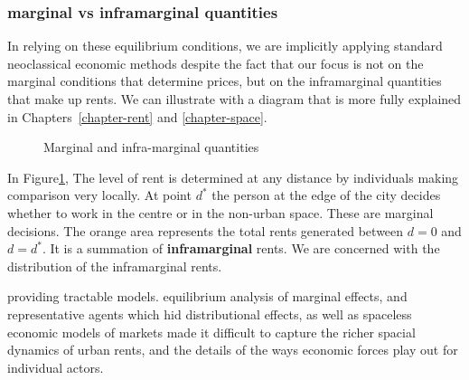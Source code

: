 {\subsubsection{\Gls{marginal} vs \gls{inframarginal} quantities}

In relying on these equilibrium conditions, we are implicitly applying standard neoclassical economic methods despite the fact that our focus is not on the \gls{marginal} conditions that determine prices, but on the \gls{inframarginal} quantities that make up rents. We can illustrate with a diagram that is more fully explained in Chapters~\ref{chapter-rent} and \ref{chapter-space}. 

\begin{figure}
    \centering
  
   \caption{Marginal and infra-marginal quantities}
    \label{fig:landrentasinframarginal}
\end{figure}
In Figure\ref{fig:landrentasinframarginal}, The level of rent is determined at any distance by individuals making comparison very locally. At point $d^*$ the person at the edge of the city decides whether to work in the centre or in the non-urban space. These are \gls{marginal} decisions. The orange area represents  the total rents generated between $d=0$ and $d=d^*$. It is a summation of \textbf{\gls{inframarginal}} rents. We are concerned with the distribution of  the inframarginal rents.


providing tractable models.  equilibrium analysis of marginal effects, and representative agents which hid distributional effects, as well as spaceless economic models of markets made it difficult to capture the richer spacial dynamics of urban rents, and the details of the ways economic forces play out for individual actors.

}
